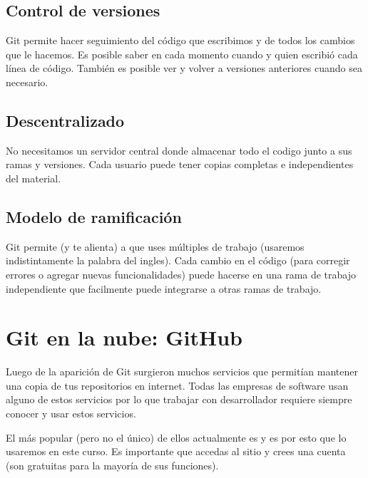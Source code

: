 \documentclass[a4paper,12pt,spanish]{sphinxmanual}
\begin{document}
\section{Control de versiones}
\label{\detokenize{git:control-de-versiones}}
\sphinxAtStartPar
Git permite hacer seguimiento del código que
escribimos y de todos los cambios que le hacemos. Es posible saber
en cada momento cuando y quien escribió cada línea de código.
También es posible ver y volver a versiones anteriores cuando sea
necesario.


\section{Descentralizado}
\label{\detokenize{git:descentralizado}}
\sphinxAtStartPar
No necesitamos un servidor central donde almacenar todo el codigo
junto a sus ramas y versiones.
Cada usuario puede tener copias completas e independientes del material.


\section{Modelo de ramificación}
\label{\detokenize{git:modelo-de-ramificacion}}
\sphinxAtStartPar
Git permite (y te alienta) a que uses múltiples  de trabajo
(usaremos indistintamente la palabra  del ingles).
Cada cambio en el código (para corregir errores o agregar nuevas
funcionalidades) puede hacerse en una rama de trabajo independiente
que facilmente puede integrarse a otras ramas de trabajo.

\sphinxstepscope


\chapter{Git en la nube: GitHub}
\label{\detokenize{github:git-en-la-nube-github}}\label{\detokenize{github::doc}}
\sphinxAtStartPar
Luego de la aparición de Git surgieron muchos servicios que
permitían mantener una copia de tus repositorios en internet.
Todas las empresas de software usan alguno de estos servicios
por lo que trabajar con desarrollador requiere siempre conocer
y usar estos servicios.

\sphinxAtStartPar
El más popular (pero no el único) de ellos actualmente es
 y es por esto que lo usaremos
en este curso.
Es importante que accedas al sitio y crees una cuenta (son gratuitas
para la mayoría de sus funciones).
\end{document}
